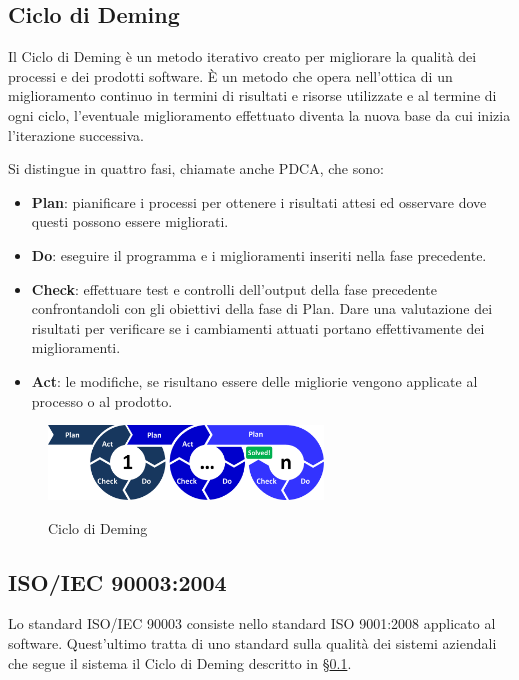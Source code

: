 	\subsection{Ciclo di Deming}	\label{cicloDeming}
	Il Ciclo di Deming è un metodo iterativo creato per migliorare la qualità dei processi e dei prodotti software. È un metodo che opera nell'ottica di un miglioramento continuo in termini di risultati e risorse utilizzate e al termine di ogni ciclo, l'eventuale miglioramento effettuato diventa la nuova base da cui inizia l'iterazione successiva.
	
	Si distingue in quattro fasi, chiamate anche PDCA, che sono:
	
	\begin{itemize}
		\item \textbf{Plan}: pianificare i processi per ottenere i risultati attesi ed osservare dove questi possono essere migliorati.
		\item \textbf{Do}: eseguire il programma e i miglioramenti inseriti nella fase precedente.
		\item \textbf{Check}: effettuare test e controlli dell'output della fase precedente confrontandoli con gli obiettivi della fase di Plan. Dare una valutazione dei risultati per verificare se i cambiamenti attuati portano effettivamente dei miglioramenti.
		\item \textbf{Act}: le modifiche, se risultano essere delle migliorie vengono applicate al processo o al prodotto.
	\end{itemize}

	\begin{figure}[H]
		\centering
		\includegraphics[width=0.65\textwidth]{img/PDCA}
		\label{fig:PDCA}
		\caption[Ciclo di Deming]{Ciclo di Deming\protect\footnotemark}
	\end{figure}


	\subsection{ISO/IEC 90003:2004}
	Lo standard ISO/IEC 90003 consiste nello standard ISO 9001:2008 applicato al software. Quest'ultimo tratta di uno standard sulla qualità dei sistemi aziendali che segue il sistema il Ciclo di Deming descritto in \S\ref{cicloDeming}.
	

